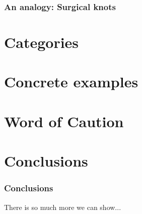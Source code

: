 \documentclass{beamer}
\begin{document}
\begin{frame}
\frametitle {An analogy: Surgical knots}


\end{frame}
\section{Categories}

\section{Concrete examples}

\section{Word of Caution}

\section{Conclusions}
\begin{frame}
\frametitle{Conclusions} 
There is so much more we can show...
 
\end{frame}

\end{document}
